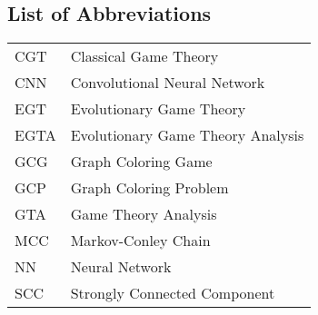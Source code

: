 \subsection*{List of Abbreviations}

\begin{longtable}[l]{l|l}
    CGT  & Classical Game Theory \\
    CNN  & Convolutional Neural Network \\
    EGT  & Evolutionary Game Theory \\
    EGTA & Evolutionary Game Theory Analysis \\
    GCG  & Graph Coloring Game \\
    GCP  & Graph Coloring Problem \\
    GTA  & Game Theory Analysis \\
    MCC  & Markov-Conley Chain \\
    NN   & Neural Network \\
    SCC  & Strongly Connected Component \\
\end{longtable}